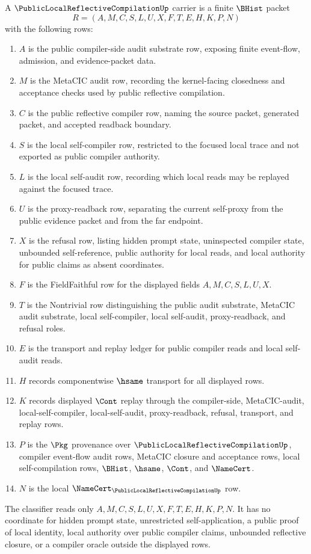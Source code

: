 \begin{definition}
\label{def:public-local-reflective-compilation-carrier}
A $\PublicLocalReflectiveCompilationUp$ carrier is a finite $\BHist$ packet
$$
R=(A,M,C,S,L,U,X,F,T,E,H,K,P,N)
$$
with the following rows:
\begin{enumerate}
\item $A$ is the public compiler-side audit substrate row, exposing finite event-flow, admission, and evidence-packet data.
\item $M$ is the MetaCIC audit row, recording the kernel-facing closedness and acceptance checks used by public reflective compilation.
\item $C$ is the public reflective compiler row, naming the source packet, generated packet, and accepted readback boundary.
\item $S$ is the local self-compiler row, restricted to the focused local trace and not exported as public compiler authority.
\item $L$ is the local self-audit row, recording which local reads may be replayed against the focused trace.
\item $U$ is the proxy-readback row, separating the current self-proxy from the public evidence packet and from the far endpoint.
\item $X$ is the refusal row, listing hidden prompt state, uninspected compiler state, unbounded self-reference, public authority for local reads, and local authority for public claims as absent coordinates.
\item $F$ is the FieldFaithful row for the displayed fields $A,M,C,S,L,U,X$.
\item $T$ is the Nontrivial row distinguishing the public audit substrate, MetaCIC audit substrate, local self-compiler, local self-audit, proxy-readback, and refusal roles.
\item $E$ is the transport and replay ledger for public compiler reads and local self-audit reads.
\item $H$ records componentwise $\hsame$ transport for all displayed rows.
\item $K$ records displayed $\Cont$ replay through the compiler-side, MetaCIC-audit, local-self-compiler, local-self-audit, proxy-readback, refusal, transport, and replay rows.
\item $P$ is the $\Pkg$ provenance over $\PublicLocalReflectiveCompilationUp$, compiler event-flow audit rows, MetaCIC closure and acceptance rows, local self-compilation rows, $\BHist$, $\hsame$, $\Cont$, and $\NameCert$.
\item $N$ is the local $\NameCert_{\PublicLocalReflectiveCompilationUp}$ row.
\end{enumerate}
The classifier reads only $A,M,C,S,L,U,X,F,T,E,H,K,P,N$. It has no coordinate for hidden prompt state, unrestricted self-application, a public proof of local identity, local authority over public compiler claims, unbounded reflective closure, or a compiler oracle outside the displayed rows.
\end{definition}

